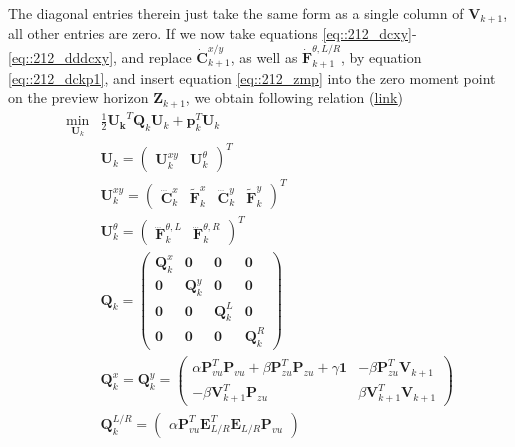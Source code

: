 The diagonal entries therein just take the same form as a single column of $\bm{V}_{k+1}$, all other entries are zero. If we now take equations \ref{eq::212_dcxy}-\ref{eq::212_dddcxy}, and replace $\dot{\bm{C}}_{k+1}^{x/y}$, as well as $\dot{\bm{F}}_{k+1}^{\theta,L/R}$, by equation \ref{eq::212_dckp1}, and insert equation \ref{eq::212_zmp} into the zero moment point on the preview horizon $\bm{Z}_{k+1}$, we obtain following relation (\href{https://github.com/mhubii/nmpc_pattern_generator/blob/5a213044c927dc6aac9f7e32ce1e5fb472cd67bb/libs/pattern_generator/src/nmpc_generator.cpp#L145}{\underline{link}})
\begin{align}
	\min_{\bm{U}_k} &\frac{1}{2}\bm{U_k}^T\bm{Q}_k\bm{U}_k + \bm{p}_k^T\bm{U}_k
	\label{eq::212_canqp} \\
	& \bm{U}_k = \begin{pmatrix}
	\bm{U}^{xy}_k & \bm{U}^\theta_k
	\end{pmatrix}^T\\	
	&\bm{U}^{xy}_k = \begin{pmatrix}
	\dddot{\bm{C}}^x_k & \tilde{\bm{F}}_k^x & \dddot{\bm{C}}_k^y & \tilde{\bm{F}}_k^y
	\end{pmatrix}^T\\
	&\bm{U}^\theta_k = \begin{pmatrix} \dddot{\bm{F}}_k^{\theta, L} & \dddot{\bm{F}}_k^{\theta, R} 
	\end{pmatrix}^T \\
	&\bm{Q}_k = \begin{pmatrix}
	\bm{Q}_k^{x} & \bm{0} & \bm{0} & \bm{0} \\
	\bm{0} & \bm{Q}_k^{y} & \bm{0} & \bm{0} \\
	\bm{0} & \bm{0} & \bm{Q}_k^L & \bm{0} \\ 
	\bm{0} & \bm{0} & \bm{0} & \bm{Q}_k^R
	\end{pmatrix}
	\label{eq::212_qk}\\
	& \bm{Q}_k^x = \bm{Q}_k^y = \begin{pmatrix}
		\alpha\bm{P}_{vu}^T\bm{P}_{vu}+\beta\bm{P}_{zu}^T\bm{P}_{zu}+\gamma\bm{1} & -\beta\bm{P}_{zu}^T\bm{V}_{k+1} \\
		-\beta\bm{V}_{k+1}^T\bm{P}_{zu} & \beta\bm{V}_{k+1}^T\bm{V}_{k+1}
	\end{pmatrix}\\
	& \bm{Q}_k^{L/R} = \begin{pmatrix}
		\alpha\bm{P}_{vu}^T\bm{E}_{L/R}^T\bm{E}_{L/R}\bm{P}_{vu}
	\end{pmatrix}\\

\end{align}
